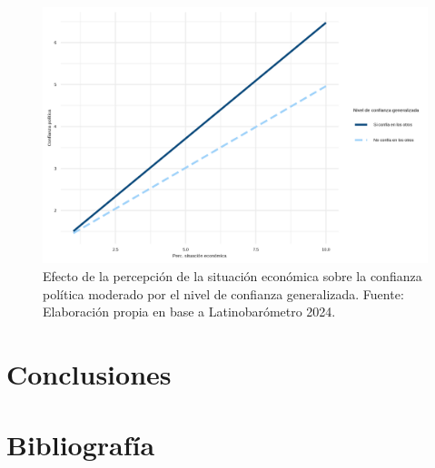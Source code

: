 \documentclass[12pt,twoside]{templates/facsothesis}
\begin{document}
\begin{figure}[!ht]

{\centering \includegraphics[width=1\linewidth,]{IPO/output/graphs/interaccion} 

}

\caption{Efecto de la percepción de la situación económica sobre la confianza política moderado por el nivel de confianza generalizada. Fuente: Elaboración propia en base a Latinobarómetro 2024.}\label{fig:grafico-4}
\end{figure}

\chapter{Conclusiones}\label{conclusiones}

\chapter*{Bibliografía}\label{bibliografuxeda}



\end{document}
